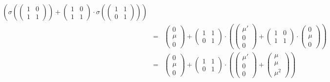 \begin{eqnarray*}
\left(
	\sigma\left(
		\left(\begin{matrix} 1 & 0 \\ 1 & 1 \end{matrix}\right)
	\right) +
	\left(\begin{matrix} 1 & 0 \\ 1 & 1 \end{matrix}\right)\cdot
	\sigma\left(
		\left(\begin{matrix} 1 & 1 \\ 0 & 1 \end{matrix}\right)
	\right)
\right)\\ 
&=&
\left(\begin{matrix} 0 \\ \mu \\ 0 \end{matrix}\right)
+
\left(\begin{matrix} 1 & 1 \\ 0 & 1 \end{matrix}\right) \cdot
\left(
	\left(\begin{matrix} \mu' \\ 0 \\ 0 \end{matrix}\right)
	+
	\left(\begin{matrix} 1 & 0 \\ 1 & 1 \end{matrix}\right)\cdot
	\left(\begin{matrix} 0 \\ \mu \\ 0 \end{matrix}\right)
\right)\\ 
&=&
\left(\begin{matrix} 0 \\ \mu \\ 0 \end{matrix}\right)
+
\left(\begin{matrix} 1 & 1 \\ 0 & 1 \end{matrix}\right) \cdot
\left(
	\left(\begin{matrix} \mu' \\ 0 \\ 0 \end{matrix}\right)
	+
	\left(\begin{matrix} \mu \\ \mu \\ \mu^2 \end{matrix}\right)
\right)\\ 

\end{eqnarray*}
